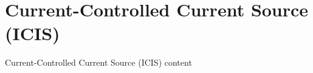 \section{Current-Controlled Current Source (ICIS)}
\begin{frame}{Current-Controlled Current Source (ICIS)}
	content
\end{frame}